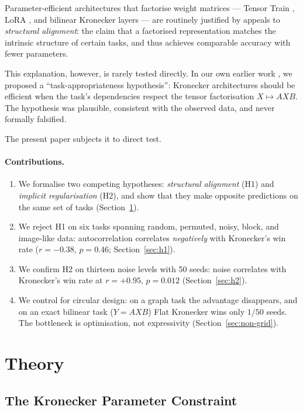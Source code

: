 \documentclass[11pt,a4paper]{article}
\begin{document}
Parameter-efficient architectures that factorise weight matrices
--- Tensor Train \cite{novikov2015tensor}, LoRA \cite{hu2021lora},
and bilinear Kronecker layers \cite{tolstikhin2021mlp} --- are
routinely justified by appeals to \emph{structural alignment}: the
claim that a factorised representation matches the intrinsic
structure of certain tasks, and thus achieves comparable accuracy
with fewer parameters.

This explanation, however, is rarely tested directly. In our own
earlier work \cite{esa2026preprint2}, we proposed a
``task-appropriateness hypothesis'': Kronecker architectures
should be efficient when the task's dependencies respect the
tensor factorisation $X \mapsto AXB$. The hypothesis was plausible,
consistent with the observed data, and never formally falsified.

The present paper subjects it to direct test.

\paragraph{Contributions.}
\begin{enumerate}
\item We formalise two competing hypotheses: \emph{structural
alignment} (H1) and \emph{implicit regularisation} (H2), and show
that they make opposite predictions on the same set of tasks
(Section~\ref{sec:theory}).
\item We reject H1 on six tasks spanning random, permuted, noisy,
block, and image-like data: autocorrelation correlates
\emph{negatively} with Kronecker's win rate
($r = -0.38$, $p = 0.46$; Section~\ref{sec:h1}).
\item We confirm H2 on thirteen noise levels with 50 seeds: noise
correlates with Kronecker's win rate at $r = +0.95$,
$p = 0.012$ (Section~\ref{sec:h2}).
\item We control for circular design: on a graph task the
advantage disappears, and on an exact bilinear task
($Y = AXB$) Flat Kronecker wins only $1/50$ seeds. The bottleneck
is optimisation, not expressivity (Section~\ref{sec:non-grid}).
\end{enumerate}


\section{Theory}
\label{sec:theory}

\subsection{The Kronecker Parameter Constraint}
\label{sec:constraint}
\end{document}
